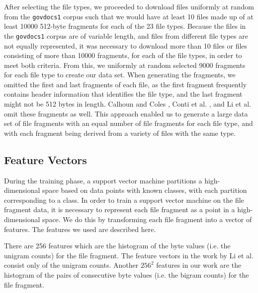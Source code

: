 \documentclass[letter,11pt]{article}
\begin{document}
After selecting the file types, we proceeded to download files uniformly at random from the \texttt{govdocs1} corpus such that we would have at least 10 files made up of at least 10000 512-byte fragments for each of the 23 file types. Because the files in the \texttt{govdocs1} corpus are of variable length, and files from different file types are not equally represented, it was necessary to download more than 10 files or files consisting of more than 10000 fragments, for each of the file types, in order to meet both criteria. From this, we uniformly at random selected 9000 fragments for each file type to create our data set. When generating the fragments, we omitted the first and last fragments of each file, as the first fragment frequently contains header information that identifies the file type, and the last fragment might not be 512 bytes in length. Calhoun and Coles \cite{Calhoun08}, Conti et al. \cite{Conti10}, and Li et al. \cite{Li10} omit these fragments as well. This approach enabled us to generate a large data set of file fragments with an equal number of file fragments for each file type, and with each fragment being derived from a variety of files with the same type.

\subsection{Feature Vectors}
\label{Subsection:FeatureVectors}
During the training phase, a support vector machine partitions a high-dimensional space based on data points with known classes, with each partition corresponding to a class. In order to train a support vector machine on the file fragment data, it is necessary to represent each file fragment as a point in a high-dimensional space. We do this by transforming each file fragment into a vector of features. The features we used are described here.

There are 256 features which are the histogram of the byte values (i.e. the unigram counts) for the file fragment. The feature vectors in the work by Li et al. \cite{Li10} consist only of the unigram counts. Another $256^2$ features in our work are the histogram of the pairs of consecutive byte values (i.e. the bigram counts) for the file fragment.
\end{document}

